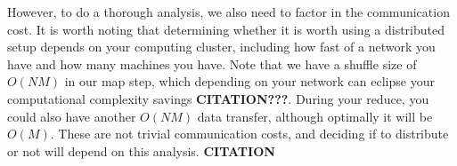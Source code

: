 \vspace{5 mm}
\noindent
However, to do a thorough analysis, we also need to factor in the communication 
cost. It is worth noting that determining whether it is worth using a 
distributed setup depends on your computing cluster, including how fast of a 
network you have and how many machines you have. Note that we have a shuffle 
size of $O(N M)$ in our map step, which depending on your network can 
eclipse your computational complexity savings \textbf{CITATION???}. During your 
reduce, you could also have another $O(N M)$ data transfer, although optimally 
it will be $O(M)$. These are not trivial communication costs, and deciding if 
to distribute or not will depend on this analysis. \textbf{CITATION}